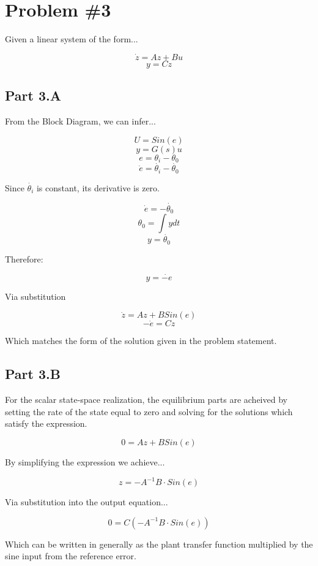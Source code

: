 

    \section*{Problem \#3}

    Given a linear system of the form...

    $$\dot{z} = Az + Bu $$
    $$ y = Cz $$

    \subsection*{Part 3.A}

    From the Block Diagram, we can infer...

    $$ U = Sin(e)$$
    $$ y = G(s)u $$
    $$ e = \theta_{i} - \theta_{0}$$
    $$\dot{e} = \dot{\theta_{i}} - \dot{\theta_{0}}$$

    \noindent Since $\dot{\theta_{i}}$ is constant, its derivative is zero.

    $$ \dot{e} =  - \dot{\theta_{0}} $$
    $$ \theta_{0} = \int y dt $$
    $$ y = \dot{\theta_{0}} $$

    Therefore:

    $$ y = \dot{-e} $$

    Via substitution

    $$ \dot{z} = Az + BSin(e) $$
    $$ -\dot{e} = Cz $$

    Which matches the form of the solution given in the problem statement.



    \subsection*{Part 3.B}

    For the scalar state-space realization, the equilibrium parts are acheived by setting the rate of the state equal to zero and solving for the solutions which satisfy the expression.

    $$ 0 = Az + BSin(e)$$

    By simplifying the expression we achieve...

    $$ z = -A^{-1}B \cdot Sin(e)$$

    Via substitution into the output equation...

    $$ 0 = C \left( -A^{-1}B \cdot Sin(e) \right) $$

    Which can be written in generally as the plant transfer function multiplied by the sine input from the reference error.

